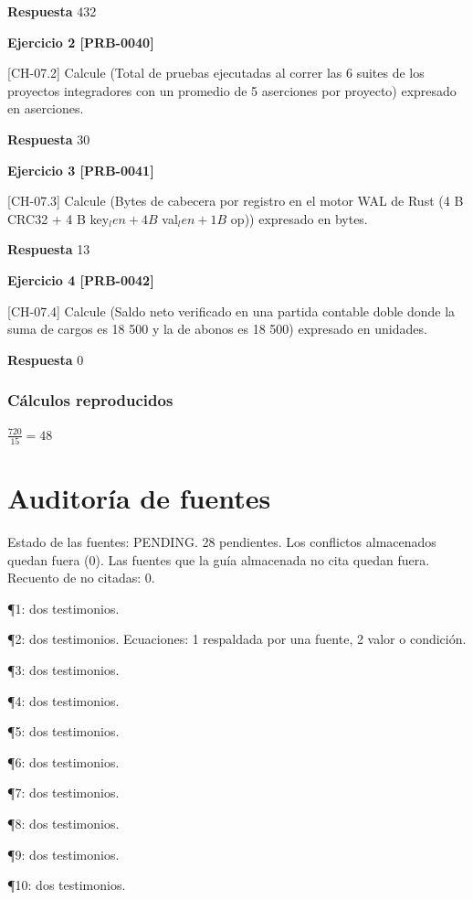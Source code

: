 \documentclass{book}
\begin{document}
\noindent\textbf{Respuesta} 432

\noindent\textbf{Ejercicio 2 [PRB-0040]}

[CH-07.2] Calcule (Total de pruebas ejecutadas al correr las 6 suites de los proyectos integradores con un promedio de 5 aserciones por proyecto) expresado en aserciones.

\noindent\textbf{Respuesta} 30

\noindent\textbf{Ejercicio 3 [PRB-0041]}

[CH-07.3] Calcule (Bytes de cabecera por registro en el motor WAL de Rust (4 B CRC32 + 4 B key\(_len + 4 B\) val\(_len + 1 B\) op)) expresado en bytes.

\noindent\textbf{Respuesta} 13

\noindent\textbf{Ejercicio 4 [PRB-0042]}

[CH-07.4] Calcule (Saldo neto verificado en una partida contable doble donde la suma de cargos es 18 500 y la de abonos es 18 500) expresado en unidades.

\noindent\textbf{Respuesta} 0

\subsection*{Cálculos reproducidos}

\(\frac{720}{15} = 48\)
\chapter{Auditoría de fuentes}

\noindent Estado de las fuentes: PENDING. 28 pendientes. Los conflictos almacenados quedan fuera (0). Las fuentes que la guía almacenada no cita quedan fuera. Recuento de no citadas: 0.

\noindent ¶1: dos testimonios.

\noindent ¶2: dos testimonios. Ecuaciones: 1 respaldada por una fuente, 2 valor o condición.

\noindent ¶3: dos testimonios.

\noindent ¶4: dos testimonios.

\noindent ¶5: dos testimonios.

\noindent ¶6: dos testimonios.

\noindent ¶7: dos testimonios.

\noindent ¶8: dos testimonios.

\noindent ¶9: dos testimonios.

\noindent ¶10: dos testimonios.
\end{document}
